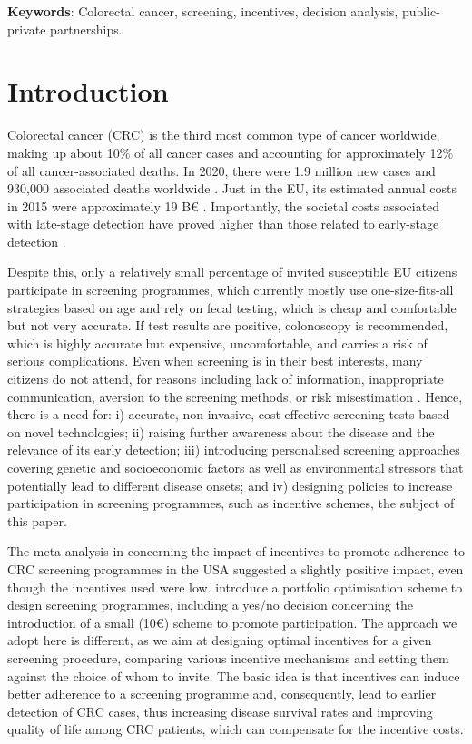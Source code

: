 \documentclass[12pt]{article}
\begin{document}
\begin{small}
\textbf{Keywords}: Colorectal cancer, screening, incentives, decision analysis, public-private partnerships.     
\end{small}



\section{Introduction}\label{intro}
 
Colorectal cancer (CRC) is the third most common type of cancer worldwide, making up about 10\% of all cancer cases \citep{WHO} and accounting for approximately 12\% of all cancer-associated deaths. In 2020, there were 1.9 million new cases and 930,000 associated deaths worldwide \citep{morgan2023global}. Just in the EU, its estimated annual costs in 2015 were approximately 19 B€ \citep{henderson2021economic}. Importantly, the societal costs associated with late-stage detection have proved higher than those related to early-stage detection \citep{mar2017cost}.

Despite this, only a relatively small percentage of invited susceptible EU citizens participate in screening programmes, which currently mostly use one-size-fits-all strategies based on age and rely on fecal testing, which is cheap and comfortable but not very accurate. If test results are positive, colonoscopy is recommended, which is highly accurate but expensive, uncomfortable, and carries a risk of serious complications. Even when screening is in their best interests, many citizens do not attend, for reasons including lack of information, inappropriate communication, aversion to the screening methods, or risk misestimation \citep{KASTRINOS}. Hence, there is a need for: i) accurate, non-invasive, cost-effective screening tests based on novel technologies; ii) raising further awareness about the disease and the relevance of its early detection; iii) introducing personalised screening approaches covering genetic and socioeconomic factors as well as environmental stressors that potentially lead to different disease onsets; and iv) designing policies to increase participation in screening programmes, such as incentive schemes, the subject of this paper.

The meta-analysis in \cite{facciorusso2021addition} concerning the impact of incentives to promote adherence to CRC screening programmes in the USA suggested a slightly positive impact, even though the incentives used were low. \cite{neuvonen2025optimizing} introduce a portfolio optimisation scheme to design screening programmes, including a yes/no decision concerning the introduction of a small (10€) scheme to promote participation. The approach we adopt here is different, as we aim at designing optimal incentives for a given screening procedure, comparing various incentive mechanisms and setting them against the choice of whom to invite. The basic idea is that incentives can induce better adherence to a screening programme and, consequently, lead to earlier detection of CRC cases, thus increasing disease survival rates and improving quality of life among CRC patients, which can compensate for the incentive costs.
\end{document}
